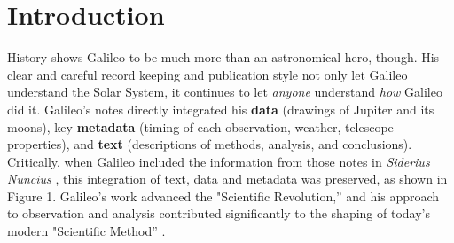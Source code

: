 \section{Introduction}
History shows Galileo to be much more than an
astronomical hero, though. His clear and careful record keeping and
publication style not only let Galileo understand the Solar System, it
continues to let \emph{anyone} understand \emph{how} Galileo did it.
Galileo's notes directly integrated his \textbf{data} (drawings of
Jupiter and its moons), key \textbf{metadata} (timing of each
observation, weather, telescope properties), and \textbf{text}
(descriptions of methods, analysis, and conclusions). Critically, when
Galileo included the information from those notes in \emph{Siderius
Nuncius} \cite{galilei}, this integration of text, data and metadata was
preserved, as shown in Figure 1. Galileo's work advanced the
"Scientific Revolution,'' and his approach to observation and analysis
contributed significantly to the shaping of today's modern "Scientific
Method'' \cite{galilei1618assayer,galilei1957discoveries}. 